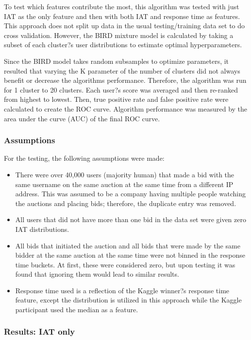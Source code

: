\documentclass{article} %
\begin{document}
To test which features contribute the most, this algorithm was tested with just IAT as the only feature and then with both IAT and response time as features.
This approach does not split up data in the usual testing/training data set to do cross validation.
However, the BIRD mixture model is calculated by taking a subset of each cluster?s user distributions to estimate optimal hyperparameters.

Since the BIRD model takes random subsamples to optimize parameters, it resulted that varying the K parameter of the number of clusters did not always benefit or decrease the algorithms performance.
Therefore, the algorithm was run for 1 cluster to 20 clusters.
Each user?s score was averaged and then re-ranked from highest to lowest.
Then, true positive rate and false positive rate were calculated to create the ROC curve.
Algorithm performance was measured by the area under the curve (AUC) of the final ROC curve.

\subsubsection{Assumptions}

For the testing, the following assumptions were made:

\begin{itemize}
\item There were over 40,000 users (majority human) that made a bid with the same username on the same auction at the same time from a different IP address.
This was assumed to be a company having multiple people watching the auctions and placing bids; therefore, the duplicate entry was removed.
\item All users that did not have more than one bid in the data set were given zero IAT distributions.
\item All bids that initiated the auction and all bids that were made by the same bidder at the same auction at the same time were not binned in the response time buckets.
At first, these were considered zero, but upon testing it was found that ignoring them would lead to similar results.
\item Response time used is a reflection of the Kaggle winner?s response time feature, except the distribution is utilized in this approach while the Kaggle participant used the median as a feature.
\end{itemize}

\subsubsection{Results: IAT only}
\end{document}
